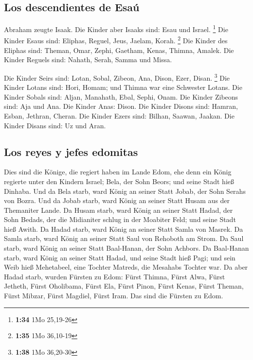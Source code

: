 \hypertarget{los-descendientes-de-esauxfa}{%
\subsection{Los descendientes de
Esaú}\label{los-descendientes-de-esauxfa}}

 Abraham zeugte Isaak. Die Kinder aber Isaaks sind: Esau
und Israel. \footnote{\textbf{1:34} 1Mo 25,19-26}  Die
Kinder Esaus sind: Eliphas, Reguel, Jeus, Jaelam, Korah. \footnote{\textbf{1:35}
  1Mo 36,10-19}  Die Kinder des Eliphas sind: Theman,
Omar, Zephi, Gaetham, Kenas, Thimna, Amalek.  Die Kinder
Reguels sind: Nahath, Serah, Samma und Missa.

 Die Kinder Seirs sind: Lotan, Sobal, Zibeon, Ana, Dison,
Ezer, Disan. \footnote{\textbf{1:38} 1Mo 36,20-30}  Die
Kinder Lotans sind: Hori, Homam; und Thimna war eine Schwester Lotans.
 Die Kinder Sobals sind: Aljan, Manahath, Ebal, Sephi,
Onam. Die Kinder Zibeons sind: Aja und Ana.  Die Kinder
Anas: Dison. Die Kinder Disons sind: Hamran, Esban, Jethran, Cheran.
 Die Kinder Ezers sind: Bilhan, Saawan, Jaakan. Die
Kinder Disans sind: Uz und Aran.

\hypertarget{los-reyes-y-jefes-edomitas}{%
\subsection{Los reyes y jefes
edomitas}\label{los-reyes-y-jefes-edomitas}}

 Dies sind die Könige, die regiert haben im Lande Edom,
ehe denn ein König regierte unter den Kindern Israel; Bela, der Sohn
Beors; und seine Stadt hieß Dinhaba.  Und da Bela starb,
ward König an seiner Statt Jobab, der Sohn Serahs von Bozra.
 Und da Jobab starb, ward König an seiner Statt Husam aus
der Themaniter Lande.  Da Husam starb, ward König an
seiner Statt Hadad, der Sohn Bedads, der die Midianiter schlug in der
Moabiter Feld; und seine Stadt hieß Awith.  Da Hadad
starb, ward König an seiner Statt Samla von Masrek.  Da
Samla starb, ward König an seiner Statt Saul von Rehoboth am Strom.
 Da Saul starb, ward König an seiner Statt Baal-Hanan,
der Sohn Achbors.  Da Baal-Hanan starb, ward König an
seiner Statt Hadad, und seine Stadt hieß Pagi; und sein Weib hieß
Mehetabeel, eine Tochter Matreds, die Mesahabs Tochter war.
 Da aber Hadad starb, wurden Fürsten zu Edom: Fürst
Thimna, Fürst Alwa, Fürst Jetheth,  Fürst Oholibama,
Fürst Ela, Fürst Pinon,  Fürst Kenas, Fürst Theman, Fürst
Mibzar,  Fürst Magdiel, Fürst Iram. Das sind die Fürsten
zu Edom.

